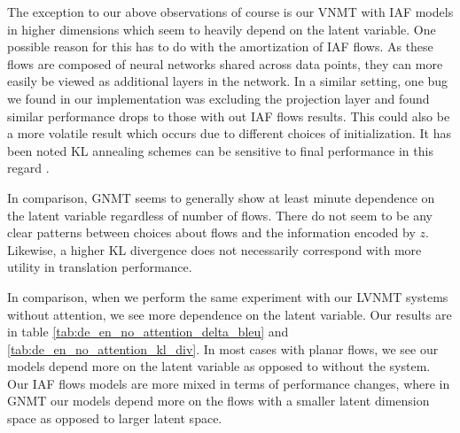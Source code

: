 The exception to our above observations of course is our \ac{VNMT} with \ac{IAF} models in higher dimensions which seem to heavily depend on the latent variable. One possible reason for this has to do with the amortization of \ac{IAF} flows. As these flows are composed of neural networks shared across data points, they can more easily be viewed as additional layers in the network. In a similar setting, one bug we found in our implementation was excluding the projection layer and found similar performance drops to those with out IAF flows results. This could also be a more volatile result which occurs due to different choices of initialization. It has been noted KL annealing schemes can be sensitive to final performance in this regard \cite{sphericallatent2018Xu}.

In comparison, \ac{GNMT} seems to generally show at least minute dependence on the latent variable regardless of number of flows. There do not seem to be any clear patterns between choices about flows and the information encoded by $z$. Likewise, a higher KL divergence does not necessarily correspond with more utility in translation performance.  

In comparison, when we perform the same experiment with our \ac{LVNMT} systems without attention, we see more dependence on the latent variable. Our results are in table \ref{tab:de_en_no_attention_delta_bleu} and \ref{tab:de_en_no_attention_kl_div}. In most cases with planar flows, we see our models depend more on the latent variable as opposed to without the system. Our \ac{IAF} flows models are more mixed in terms of performance changes, where in \ac{GNMT} our models depend more on the flows with a smaller latent dimension space as opposed to larger latent space. 




